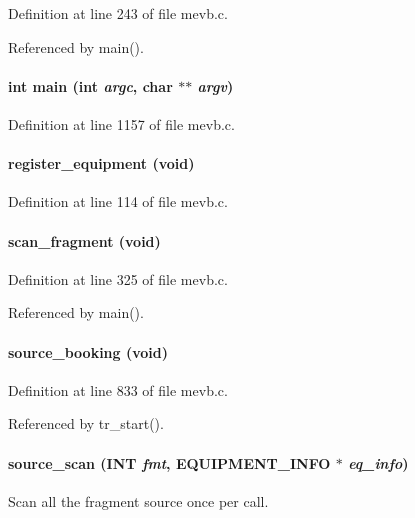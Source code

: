 Definition at line 243 of file mevb.c.

Referenced by main().
\paragraph[{main}]{\setlength{\rightskip}{0pt plus 5cm}int main (int {\em argc}, \/  char $\ast$$\ast$ {\em argv})}\hfill\label{mevb_8c_a3c04138a5bfe5d72780bb7e82a18e627}


Definition at line 1157 of file mevb.c.
\paragraph[{register\_\-equipment}]{ register\_\-equipment (void)}\hfill\label{mevb_8c_ab834073e5b665fccaa4eff2a61bc9372}


Definition at line 114 of file mevb.c.
\paragraph[{scan\_\-fragment}]{ scan\_\-fragment (void)}\hfill\label{mevb_8c_ac2e393bd6512bf4102e2bbfdccd54f8d}


Definition at line 325 of file mevb.c.

Referenced by main().
\paragraph[{source\_\-booking}]{ source\_\-booking (void)}\hfill\label{mevb_8c_a99690888a7fc7d2ea83b4006c4644596}


Definition at line 833 of file mevb.c.

Referenced by tr\_\-start().
\paragraph[{source\_\-scan}]{ source\_\-scan ({\bf INT} {\em fmt}, \/  {\bf EQUIPMENT\_\-INFO} $\ast$ {\em eq\_\-info})}\hfill\label{mevb_8c_ae77cd1e2416ccddffaec80b061b300e6}
Scan all the fragment source once per call.


